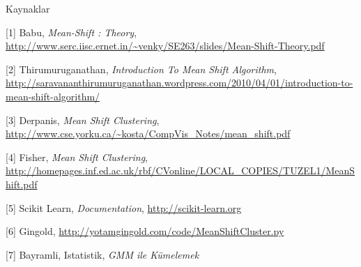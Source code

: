 \documentclass[12pt,fleqn]{article}\usepackage{../../common}
\begin{document}
Kaynaklar

[1] Babu, {\em Mean-Shift : Theory}, \url{http://www.serc.iisc.ernet.in/~venky/SE263/slides/Mean-Shift-Theory.pdf}

[2] Thirumuruganathan, {\em Introduction To Mean Shift Algorithm}, \url{http://saravananthirumuruganathan.wordpress.com/2010/04/01/introduction-to-mean-shift-algorithm/}

[3] Derpanis, {\em Mean Shift Clustering}, \url{http://www.cse.yorku.ca/~kosta/CompVis_Notes/mean_shift.pdf}

[4] Fisher, {\em Mean Shift Clustering}, \url{http://homepages.inf.ed.ac.uk/rbf/CVonline/LOCAL_COPIES/TUZEL1/MeanShift.pdf}

[5] Scikit Learn, {\em Documentation}, \url{http://scikit-learn.org}

[6] Gingold, \url{http://yotamgingold.com/code/MeanShiftCluster.py}

[7] Bayramli, Istatistik, {\em GMM ile Kümelemek}
\end{document}
